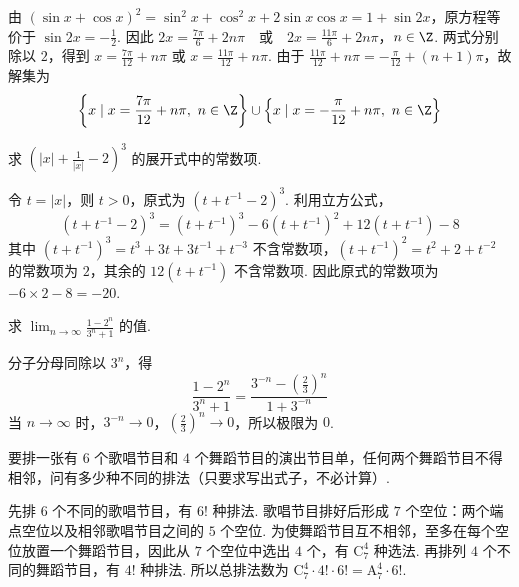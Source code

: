 \documentclass[UTF8,a4paper,oneside,11pt]{ctexbook}
\begin{document}
\begin{solution}
由 \((\sin x+\cos x)^2=\sin^2x+\cos^2x+2\sin x\cos x=1+\sin2x\)，原方程等价于 \(\sin2x=-\frac12\). 因此
\(2x=\frac{7\pi}{6}+2n\pi\quad\text{或}\quad 2x=\frac{11\pi}{6}+2n\pi\)，\(n\in\Z\).
两式分别除以 \(2\)，得到 \(x=\frac{7\pi}{12}+n\pi\) 或 \(x=\frac{11\pi}{12}+n\pi\). 由于 \(\frac{11\pi}{12}+n\pi=-\frac{\pi}{12}+(n+1)\pi\)，故解集为
\[
\left\{x\mid x=\frac{7\pi}{12}+n\pi,\ n\in\Z\right\}\cup\left\{x\mid x=-\frac{\pi}{12}+n\pi,\ n\in\Z\right\}
\]
\end{solution}

\begin{problem}

求 \(\left(|x| + \frac{1}{|x|} - 2\right)^3\) 的展开式中的常数项.
\end{problem}

\begin{solution}
令 \(t=|x|\)，则 \(t>0\)，原式为 \((t+t^{-1}-2)^3\). 利用立方公式，
\[
(t+t^{-1}-2)^3=(t+t^{-1})^3-6(t+t^{-1})^2+12(t+t^{-1})-8
\]
其中 \((t+t^{-1})^3=t^3+3t+3t^{-1}+t^{-3}\) 不含常数项，\((t+t^{-1})^2=t^2+2+t^{-2}\) 的常数项为 \(2\)，其余的 \(12(t+t^{-1})\) 不含常数项. 因此原式的常数项为 \(-6\times2-8=-20\).
\end{solution}

\begin{problem}

求 \(\displaystyle\lim_{n\to \infty}\frac{1 - 2^n}{3^n + 1}\) 的值.
\end{problem}

\begin{solution}
分子分母同除以 \(3^n\)，得
\[
\frac{1-2^n}{3^n+1}=\frac{3^{-n}-\left(\frac{2}{3}\right)^n}{1+3^{-n}}
\]
当 \(n\to\infty\) 时，\(3^{-n}\to0\)，\(\left(\frac23\right)^n\to0\)，所以极限为 \(0\).
\end{solution}

\begin{problem}

要排一张有 \(6\) 个歌唱节目和 \(4\) 个舞蹈节目的演出节目单，任何两个舞蹈节目不得相邻，问有多少种不同的排法（只要求写出式子，不必计算）.
\end{problem}

\begin{solution}
先排 \(6\) 个不同的歌唱节目，有 \(6!\) 种排法. 歌唱节目排好后形成 \(7\) 个空位：两个端点空位以及相邻歌唱节目之间的 \(5\) 个空位. 为使舞蹈节目互不相邻，至多在每个空位放置一个舞蹈节目，因此从 \(7\) 个空位中选出 \(4\) 个，有 \(\mathrm C_7^4\) 种选法. 再排列 \(4\) 个不同的舞蹈节目，有 \(4!\) 种排法. 所以总排法数为 \(\mathrm C_7^4\cdot4!\cdot6!=\mathrm A_7^4\cdot6!\).
\end{solution}
\end{document}
